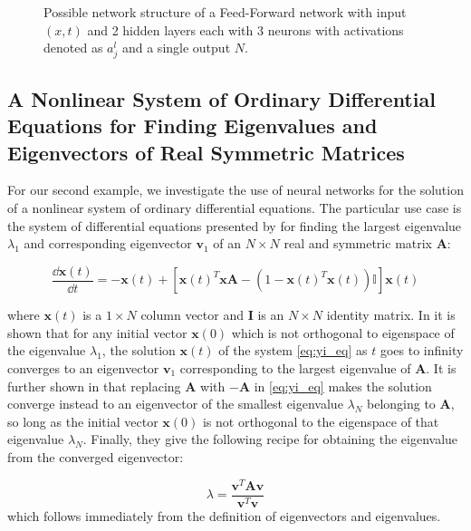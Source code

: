 \documentclass[reprint, english, nofootinbib]{revtex4-2}
\begin{document}
\begin{figure}[h!tb]
   \center
    
   \caption{Possible network structure of a Feed-Forward network with input $(x,t)$ and 2 hidden layers each with 3 neurons with activations denoted as $a^l_j$ and a single output $N$.}
\end{figure}


\subsection{A Nonlinear System of Ordinary Differential Equations for Finding Eigenvalues and Eigenvectors of Real Symmetric Matrices}
\noindent
For our second example, we investigate the use of neural networks for the solution of a nonlinear system of ordinary differential equations. The particular use case is the system of differential equations presented by \cite{Yi_2004} for finding the largest eigenvalue $\lambda_{1}$ and corresponding eigenvector $\pmb{v}_1$ of an $N \times N$ real and symmetric matrix $\mathbf{A}$:

\begin{equation}
\label{eq:yi_eq}
\frac{\dd \pmb{x}(t)}{\dd t} = - \pmb{x}(t) + [\pmb{x}(t)^T \pmb{x} \mathbf{A} - (1 - \pmb{x}(t)^T \pmb{x}(t)) \mathbb{I} ] \pmb{x}(t)
\end{equation}

where $\pmb{x}(t)$ is a $ 1 \times N$ column vector and $\mathbf{I}$ is an $N \times N$ identity matrix. In \cite{Yi_2004} it is shown that for any initial vector $\pmb{x}(0)$ which is not orthogonal to eigenspace of the eigenvalue $\lambda_1$, the solution $\pmb{x}(t)$ of the system \ref{eq:yi_eq} as $t$ goes to infinity converges to an eigenvector $\pmb{v}_1$ corresponding to the largest eigenvalue of $\mathbf{A}$. It is further shown in \cite{Yi_2004} that replacing $\mathbf{A}$ with $\mathbf{-A}$ in \ref{eq:yi_eq} makes the solution converge instead to an eigenvector of the smallest eigenvalue $\lambda_N$ belonging to $\mathbf{A}$, so long as the initial vector $\pmb{x}(0)$ is not orthogonal to the eigenspace of that eigenvalue $\lambda_N$. Finally, they give the following recipe for obtaining the eigenvalue from the converged eigenvector:

\begin{equation}
\label{eq:yi_eigenvalue}
\lambda = \frac{\pmb{v}^T \mathbf{A} \pmb{v}}{\pmb{v}^T \pmb{v}}
\end{equation}
which follows immediately from the definition of eigenvectors and eigenvalues.
\end{document}
